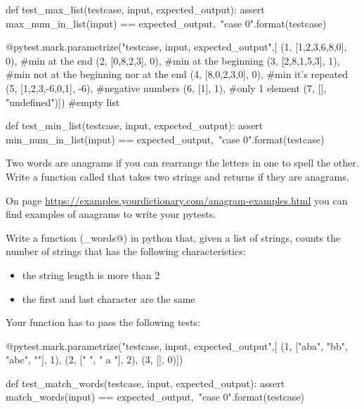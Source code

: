 \begin{exercise}
\begin{small}
\begin{python}
def test_max_list(testcase, input, expected_output):
    assert max_num_in_list(input) == expected_output,\
           "case {0}".format(testcase)
 
@pytest.mark.parametrize("testcase, input, expected_output",[
(1, [1,2,3,6,8,0], 0),   #min at the end
(2, [0,8,2,3], 0),       #min at the beginning
(3, [2,8,1,5,3], 1),     #min not at the beginning nor at the end
(4, [8,0,2,3,0], 0),     #min it's repeated
(5, [1,2,3,-6,0,1], -6), #negative numbers
(6, [1], 1),             #only 1 element
(7, [], "undefined")])   #empty list

def test_min_list(testcase, input, expected_output):
    assert min_num_in_list(input) == expected_output,\
           "case {0}".format(testcase)
\end{python}
\end{small}

\end{exercise}


\begin{exercise}
\label{anagram}
%
Two words are anagrams if you can rearrange the letters in one to spell the other. Write a function called  that takes two strings and returns  if they are anagrams.
\end{exercise}

On page \url{https://examples.yourdictionary.com/anagram-examples.html} you can find examples of anagrams to write your pytests.


\begin{exercise}
Write a function (\verb@match_words@) in python that, given a list of strings, counts the number of strings that has the following characteristics:
\begin{itemize}
\item the string length is more than 2
\item the first and last character are the same
\end{itemize}

Your function has to pass the following tests:\\

\begin{small}
\begin{python}
@pytest.mark.parametrize("testcase, input, expected_output",[
(1, ["aba", "bb", "abc", ""], 1),   
(2, ["   ", " a "], 2),              
(3, [], 0)])              

def test_match_words(testcase, input, expected_output):
    assert match_words(input) == expected_output,\
           "case {0}".format(testcase)
\end{python}
\end{small}
\end{exercise}

